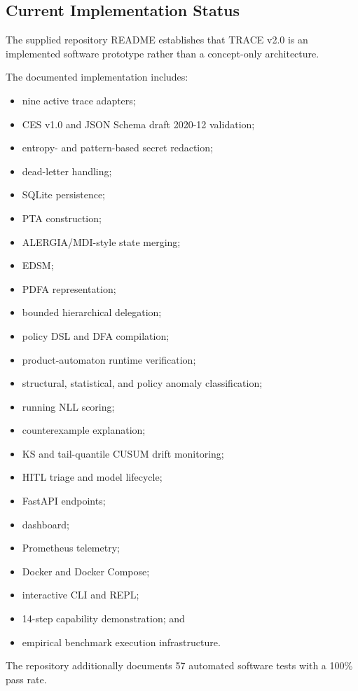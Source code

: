 \documentclass[11pt,a4paper]{article}
\begin{document}
\subsection{Current Implementation Status}

The supplied repository README establishes that TRACE v2.0 is an implemented software
prototype rather than a concept-only architecture.

The documented implementation includes:

\begin{itemize}
\item nine active trace adapters;
\item CES v1.0 and JSON Schema draft 2020-12 validation;
\item entropy- and pattern-based secret redaction;
\item dead-letter handling;
\item SQLite persistence;
\item PTA construction;
\item ALERGIA/MDI-style state merging;
\item EDSM;
\item PDFA representation;
\item bounded hierarchical delegation;
\item policy DSL and DFA compilation;
\item product-automaton runtime verification;
\item structural, statistical, and policy anomaly classification;
\item running NLL scoring;
\item counterexample explanation;
\item KS and tail-quantile CUSUM drift monitoring;
\item HITL triage and model lifecycle;
\item FastAPI endpoints;
\item dashboard;
\item Prometheus telemetry;
\item Docker and Docker Compose;
\item interactive CLI and REPL;
\item 14-step capability demonstration; and
\item empirical benchmark execution infrastructure.
\end{itemize}

The repository additionally documents 57 automated software tests with a 100\% pass
rate.
\end{document}
